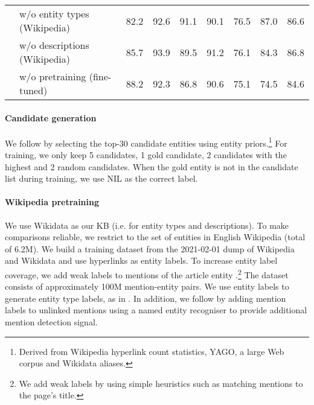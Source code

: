 \documentclass[11pt]{article}
\begin{document}
\begin{table*}[h]
{\begin{tabular}{@{}llccccccc@{}}
            & w/o entity types (Wikipedia)              & 82.2                          & 92.6           & 91.1             & 90.1             & 76.5          & \multicolumn{1}{c|}{87.0}          & 86.6                 \\
            & w/o descriptions (Wikipedia)              & 85.7                          & 93.9           & 89.5             & 91.2             & 76.1          & \multicolumn{1}{c|}{84.3}          & 86.8                 \\
            & w/o pretraining (fine-tuned)               & 88.2                          & 92.3           & 86.8             & 90.6             & 75.1          & \multicolumn{1}{c|}{74.5}          & 84.6                \\
        \bottomrule
		\end{tabular}
		}
		\caption{ED InKB micro F1 scores on in-domain and out-of-domain test sets. The best value in \textbf{bold} and second best is {\ul underlined}. Normalised accuracy is reported. *Out-of-domain datasets. Result obtained using code released by authors.}
     	\label{ed_results}
\end{table*}




\paragraph{Candidate generation}\label{candidate_gen}
We follow \citet{le-titov-2018-improving} by selecting the top-30 candidate entities using entity priors.\footnote{Derived from Wikipedia hyperlink count statistics, YAGO, a large Web corpus and Wikidata aliases.} For training, we only keep 5 candidates, 1 gold candidate, 2 candidates with the highest  and 2 random candidates. When the gold entity is not in the candidate list during training, we use NIL as the correct label.

\paragraph{Wikipedia pretraining} \label{Wikipedia}
We use Wikidata as our KB (i.e. for entity types and descriptions). To make comparisons reliable, we restrict to the set of entities in English Wikipedia (total of 6.2M). We build a training dataset from the 2021-02-01 dump of Wikipedia and Wikidata and use hyperlinks as entity labels. To increase entity label coverage, we add weak labels to mentions of the article entity \citep{Orr2021BootlegCT, broscheit-2019-investigating, Cao2020AutoregressiveER}.\footnote{We add weak labels by using simple heuristics such as matching mentions to the page's title.} The dataset consists of approximately 100M mention-entity pairs. We use entity labels to generate entity type labels, as in \citet{DBLP:conf/aaai/OnoeD20}. In addition, we follow \citet{Fvry2020EmpiricalEO} by adding mention labels to unlinked mentions using a named entity recogniser to provide additional mention detection signal.
\end{document}
